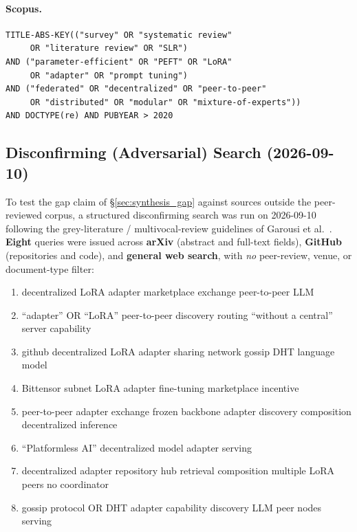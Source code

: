 \paragraph{Scopus.}
\begin{verbatim}
TITLE-ABS-KEY(("survey" OR "systematic review"
     OR "literature review" OR "SLR")
AND ("parameter-efficient" OR "PEFT" OR "LoRA"
     OR "adapter" OR "prompt tuning")
AND ("federated" OR "decentralized" OR "peer-to-peer"
     OR "distributed" OR "modular" OR "mixture-of-experts"))
AND DOCTYPE(re) AND PUBYEAR > 2020
\end{verbatim}

\subsection*{Disconfirming (Adversarial) Search (2026-09-10)}
\label{app:db_queries:adversarial}

To test the gap claim of \S\ref{sec:synthesis_gap} against sources outside the
peer-reviewed corpus, a structured disconfirming search was run on 2026-09-10
following the grey-literature / multivocal-review guidelines of Garousi et
al.~\cite{Garousi2019}. \textbf{Eight} queries were issued across \textbf{arXiv}
(abstract and full-text fields), \textbf{GitHub} (repositories and code), and
\textbf{general web search}, with \emph{no} peer-review, venue, or
document-type filter:

\begin{enumerate}\setlength{\itemsep}{1pt}
\item decentralized LoRA adapter marketplace exchange peer-to-peer LLM
\item ``adapter'' OR ``LoRA'' peer-to-peer discovery routing ``without a
      central'' server capability
\item github decentralized LoRA adapter sharing network gossip DHT language
      model
\item Bittensor subnet LoRA adapter fine-tuning marketplace incentive
\item peer-to-peer adapter exchange frozen backbone adapter discovery
      composition decentralized inference
\item ``Platformless AI'' decentralized model adapter serving
\item decentralized adapter repository hub retrieval composition multiple LoRA
      peers no coordinator
\item gossip protocol OR DHT adapter capability discovery LLM peer nodes serving
\end{enumerate}

